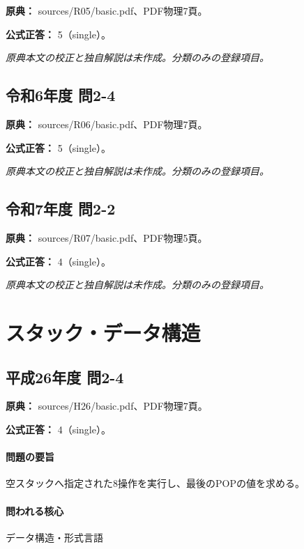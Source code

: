 \noindent\textbf{原典：} sources/R05/basic.pdf、PDF物理7頁。

\textbf{公式正答：} 5（single）。

\par\textit{原典本文の校正と独自解説は未作成。分類のみの登録項目。}

\subsection{令和6年度 問2-4}
\label{q:r06-reg-basic-2-4}

\noindent\textbf{原典：} sources/R06/basic.pdf、PDF物理7頁。

\textbf{公式正答：} 5（single）。

\par\textit{原典本文の校正と独自解説は未作成。分類のみの登録項目。}

\subsection{令和7年度 問2-2}
\label{q:r07-reg-basic-2-2}

\noindent\textbf{原典：} sources/R07/basic.pdf、PDF物理5頁。

\textbf{公式正答：} 4（single）。

\par\textit{原典本文の校正と独自解説は未作成。分類のみの登録項目。}

\section{スタック・データ構造}

\subsection{平成26年度 問2-4}
\label{q:h26-reg-basic-2-4}

\noindent\textbf{原典：} sources/H26/basic.pdf、PDF物理7頁。

\textbf{公式正答：} 4（single）。

\paragraph{問題の要旨} 空スタックへ指定された8操作を実行し、最後のPOPの値を求める。

\paragraph{問われる核心} データ構造・形式言語

